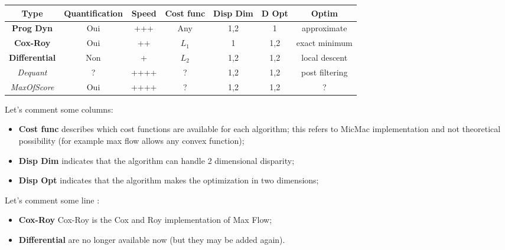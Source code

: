\begin{tabular} { c | c | c | c| c| c | c} %

 {\bf Type }        &  {Quantification} & {Speed} & {Cost func} &  {Disp Dim} &  {D Opt} & {Optim}\\  \hline \hline
 {\bf Prog Dyn }    &  {Oui} & {+++} &          { Any} & {1,2} & {1} &{approximate}\\  \hline
 {\bf Cox-Roy }     &  {Oui} & {++} &           {$L_1$} & {1} & {1,2} & {exact minimum}\\  \hline
 {\bf Differential }&  {Non} & {+} &            {$L_2$} & {1,2} & {1,2} &{local descent} \\  \hline  \hline
 {\it Dequant }     &  {?} & {++++} &           { ?} & {1,2} & {1,2} &{ post filtering}\\  \hline
 {\it MaxOfScore }  &  {Oui} & {++++} &         { ?} & {1,2} & {1,2} &{  ?} \\  \hline

\end{tabular}


Let's comment some columns:

\begin{itemize}
  \item {\bf Cost func} describes which cost functions are available for each algorithm;
        this refers to MicMac implementation and not theoretical possibility (for example
        max flow allows any convex function);

  \item {\bf Disp  Dim}  indicates that the algorithm can handle 2 dimensional disparity;

  \item {\bf Disp  Opt}  indicates that the algorithm makes the optimization in two dimensions;

\end{itemize}


Let's comment some line :

\begin{itemize}
   \item   {\bf   Cox-Roy } Cox-Roy  is the Cox and Roy implementation of Max Flow;
   \item   {\bf   Differential } are no longer available now (but they may be added again).
\end{itemize}



